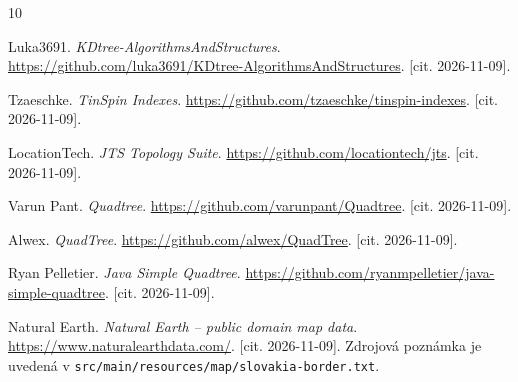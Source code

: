 \documentclass[12pt,a4paper,oneside]{report}
\begin{document}
\renewcommand{\bibname}{Zoznam použitej literatúry}
\begin{thebibliography}{10}

 Luka3691.
\textit{KDtree-AlgorithmsAndStructures}.
\url{https://github.com/luka3691/KDtree-AlgorithmsAndStructures}.
[cit. 2026-11-09].

 Tzaeschke.
\textit{TinSpin Indexes}.
\url{https://github.com/tzaeschke/tinspin-indexes}.
[cit. 2026-11-09].

 LocationTech.
\textit{JTS Topology Suite}.
\url{https://github.com/locationtech/jts}.
[cit. 2026-11-09].

 Varun Pant.
\textit{Quadtree}.
\url{https://github.com/varunpant/Quadtree}.
[cit. 2026-11-09].

 Alwex.
\textit{QuadTree}.
\url{https://github.com/alwex/QuadTree}.
[cit. 2026-11-09].

 Ryan Pelletier.
\textit{Java Simple Quadtree}.
\url{https://github.com/ryanmpelletier/java-simple-quadtree}.
[cit. 2026-11-09].

 Natural Earth.
\textit{Natural Earth -- public domain map data}.
\url{https://www.naturalearthdata.com/}.
[cit. 2026-11-09]. Zdrojová poznámka je uvedená v
\texttt{src/main/resources/map/slovakia-border.txt}.
\end{thebibliography}
\end{document}
